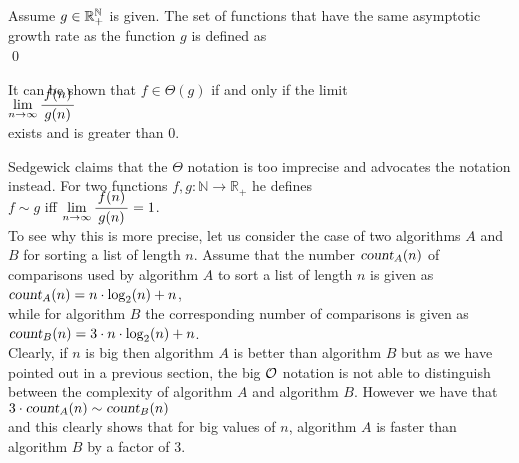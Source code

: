 \begin{Definition}[$\Theta(g)$]
  Assume $g \in {\mathbb R}_+^{{\mathbb N}}$ is given.   The set of functions that have the same asymptotic growth rate
  as the function $g$ is defined as
  \\[0.2cm]
  \hspace*{0.5cm} 
  \colorbox{red}{}
  \qed 
\end{Definition}

\noindent
It can be shown that $f \in \Theta(g)$ if and only if the limit
\\[0.4cm]
\hspace*{1.3cm}
$\lim\limits_{n \rightarrow \infty} \bruch{f(n)}{g(n)}$
\\[0.2cm]
exists and is greater than $0$.
\vspace*{0.3cm}

Sedgewick \cite{sedgewick:11} claims that the $\Theta$ notation is too imprecise and advocates the
 notation instead.  For two functions $f,g : \mathbb{N} \rightarrow \mathbb{R}_+$ he defines
\\[0.3cm]
\hspace*{1.3cm}
$f \sim g$ \quad iff \quad $\lim\limits_{n \rightarrow \infty} \bruch{f(n)}{g(n)} = 1$.
\\[0.2cm]
To see why this is more precise, let us consider the case of two algorithms $A$ and $B$ for sorting a list of length
$n$.   Assume that the number $\textsl{count}_A(n)$ of comparisons used by algorithm $A$ to sort a list of
length $n$ is given as
\\[0.2cm]
\hspace*{1.3cm}
$\textsl{count}_A(n) = n \cdot \log_2(n) + n$,
\\[0.2cm]
while for algorithm $B$ the corresponding number of comparisons is given as
\\[0.2cm]
\hspace*{1.3cm}
$\textsl{count}_B(n) = 3 \cdot n \cdot \log_2(n) + n$.
\\[0.2cm]
Clearly, if $n$ is big then algorithm $A$ is better than algorithm $B$ but as we have pointed out in a previous
section, the big $\mathcal{O}$ notation is not able to distinguish between the complexity of algorithm $A$ and
algorithm $B$.  However we have that
\\[0.2cm]
\hspace*{1.3cm}
$\displaystyle 3 \cdot \textsl{count}_A(n) \sim \textsl{count}_B(n)$
\\[0.2cm]
and this clearly shows that for big values of $n$, algorithm $A$ is faster than algorithm $B$ by a
factor of $3$.

